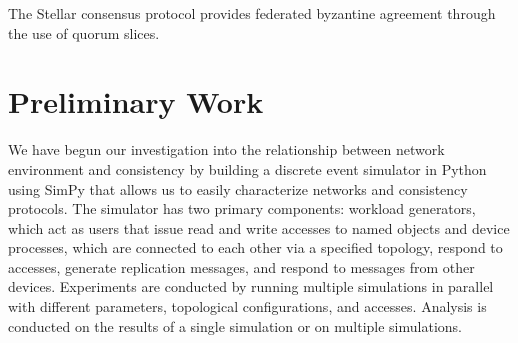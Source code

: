 \documentclass{article}
\begin{document}
The Stellar consensus protocol \cite{mazieres_stellar_2015} provides federated byzantine agreement through the use of quorum slices.

\section{Preliminary Work}

We have begun our investigation into the relationship between network environment and consistency by building a discrete event simulator in Python using SimPy that allows us to easily characterize networks and consistency protocols. The simulator has two primary components: workload generators, which act as users that issue read and write accesses to named objects and device processes, which are connected to each other via a specified topology, respond to accesses, generate replication messages, and respond to messages from other devices. Experiments are conducted by running multiple simulations in parallel with different parameters, topological configurations, and accesses. Analysis is conducted on the results of a single simulation or on multiple simulations.
\end{document}
